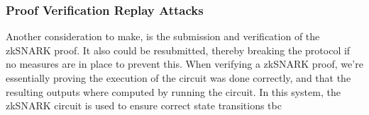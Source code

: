\documentclass[../../thesis.tex]{subfiles}
\begin{document}
\subsubsection{Proof Verification Replay Attacks}
Another consideration to make, is the submission and verification of the zkSNARK proof. It also could be resubmitted, thereby breaking the protocol if no measures are in place to prevent this. When verifying a zkSNARK proof, we're essentially proving the execution of the circuit was done correctly, and that the resulting outputs where computed by running the circuit. In this system, the zkSNARK circuit is used to ensure correct state transitions tbc



\end{document}

